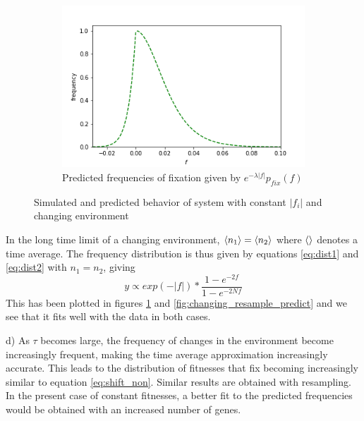 \documentclass{article}
\begin{document}
\begin{figure}[h]
\begin{subfigure}[t]{0.32\linewidth}
		\includegraphics[width = 1.0\linewidth, trim={0 0 0 0}, clip=true]{figures/no_n_combined_dists.png}
		\caption{Predicted frequencies of fixation given by $e^{-\lambda |f|} p_{fix}(f)$}
		\label{fig:changing_constant_predict}
	\end{subfigure}
\caption{Simulated and predicted behavior of system with constant $|f_i|$ and changing environment}
\label{fig:changing_constant}
\end{figure}

In the long time limit of a changing environment, $\braket{n_1} = \braket{n_2}$ where $\braket{}$ denotes a time average. The frequency distribution is thus given by equations \ref{eq:dist1} and \ref{eq:dist2} with $n_1 = n_2$, giving
\begin{equation}\label{eq:shift_non}
y \propto exp(-|f|) * \dfrac{1- e^{-2 f}}{1- e^{-2 N f}}
\end{equation}
This has been plotted in figures \ref{fig:changing_constant_predict} and \ref{fig:changing_resample_predict} and we see that it fits well with the data in both cases.

d)
As $\tau$ becomes large, the frequency of changes in the environment become increasingly frequent, making the time average approximation increasingly accurate. This leads to the distribution of fitnesses that fix becoming increasingly similar to equation \ref{eq:shift_non}. Similar results are obtained with resampling. In the present case of constant fitnesses, a better fit to the predicted frequencies would be obtained with an increased number of genes.
\end{document}
